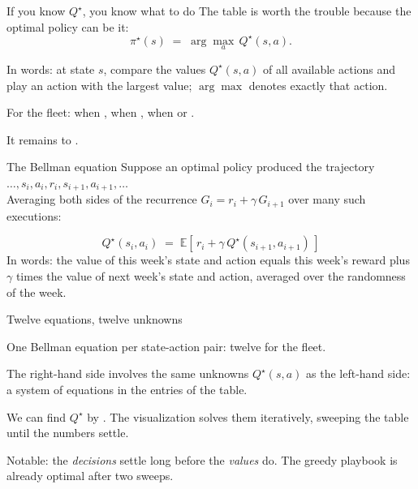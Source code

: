 \begin{frame}{If you know $Q^\star$, you know what to do}
The table is worth the trouble because the optimal policy can be  it:
\[ \pi^\star(s) \;=\; \arg\max_{a}\, Q^\star(s, a). \]
\pause
\begin{bullets}
\item In words: at state $s$, compare the values $Q^\star(s,a)$ of all available actions and play an action with the largest value; $\arg\max$ denotes exactly that action.
\pause
\item For the fleet:  when ,  when ,  when  or .
\item It remains to .
\end{bullets}
\end{frame}

\begin{frame}{The Bellman equation}
Suppose an optimal policy produced the trajectory $\ldots, s_i, a_i, r_i, s_{i+1}, a_{i+1}, \ldots$\\
Averaging both sides of the recurrence $G_i = r_i + \gamma\, G_{i+1}$ over many such executions:
\pause
\begin{lbox}
\[ Q^\star(s_i, a_i) \;=\; \mathbb{E}\left[\, r_i + \gamma\, Q^\star(s_{i+1}, a_{i+1}) \,\right] \]
In words: the value of this week's state and action equals this week's reward plus $\gamma$ times the value of next week's state and action, averaged over the randomness of the week.
\end{lbox}
\end{frame}

\begin{frame}{Twelve equations, twelve unknowns}
\begin{bullets}
\item One Bellman equation per state-action pair: twelve for the fleet.
\item The right-hand side involves the same unknowns $Q^\star(s,a)$ as the left-hand side: a system of equations in the entries of the table.
\pause
\item We can find $Q^\star$ by . The visualization solves them iteratively, sweeping the table until the numbers settle.
\pause
\item Notable: the \emph{decisions} settle long before the \emph{values} do. The greedy playbook is already optimal after two sweeps.
\end{bullets}
\end{frame}

